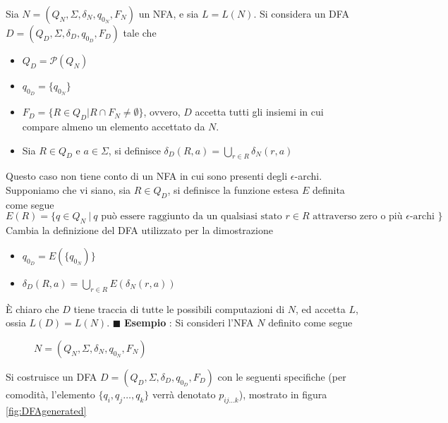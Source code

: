 \documentclass[10pt, letterpaper]{report}
\begin{document}
Sia $N=(Q_N,\Sigma,\delta_N,q_{0_N},F_N)$ un NFA, e sia $L=L(N)$. Si considera un DFA 
$D=(Q_D,\Sigma,\delta_D,q_{0_D},F_D)$ tale che \begin{itemize}
    \item $Q_D=\mathcal{P}(Q_N)$
    \item $q_{0_D}=\{q_{0_N}\}$
    \item $F_D=\{R\in Q_D | R\cap F_N\ne \emptyset\}$, ovvero, $D$ accetta tutti gli insiemi in cui compare almeno 
    un elemento accettato da $N$.
    \item Sia $R\in Q_D$ e $a\in\Sigma$, si definisce $\displaystyle\delta_D(R,a)=\bigcup_{r\in R}\delta_N(r,a)$
\end{itemize}
Questo caso non tiene conto di un NFA in cui sono presenti degli $\epsilon$-archi. Supponiamo che vi siano,  sia 
$R\in Q_D$, si definisce la funzione estesa $E$ definita come segue 
$$ E(R)=\{q\in Q_N \ |\ q\text{ può essere raggiunto da un qualsiasi stato  }r\in R\text{ attraverso zero o 
più }\epsilon\text{-archi }\}$$
Cambia la definizione del DFA utilizzato per la dimostrazione \begin{itemize}
    \item $q_{0_D}=E(\{q_{0_N})\}$
    \item $\displaystyle\delta_D(R,a)=\bigcup_{r\in R}E(\delta_N(r,a))$
\end{itemize}
È chiaro che $D$ tiene traccia di tutte le possibili computazioni di $N$, ed accetta $L$, ossia $L(D)=L(N)$. $\blacksquare$\acc 
\textbf{Esempio} : Si consideri l'NFA $N$ definito come segue
\begin{figure}[h!]
    \centering
    \caption{$N=(Q_N,\Sigma,\delta_N,q_{0_N},F_N)$}
    \label{fig:NFAExample2}
\end{figure}\acc
Si costruisce un DFA $D=(Q_D,\Sigma,\delta_D,q_{0_D},F_D)$ con le seguenti specifiche (per comodità, l'elemento $\{q_i,q_j\dots,q_k\}$ verrà 
denotato $p_{ij\dots k}$), mostrato in figura \ref{fig:DFAgenerated}
\end{document}
